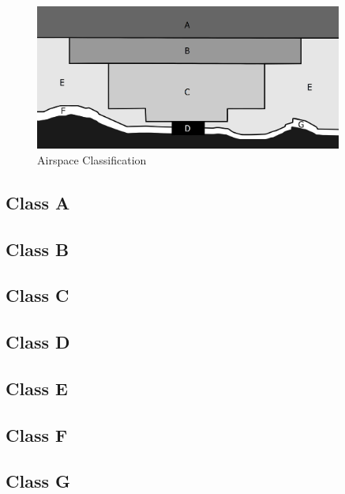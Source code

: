 \begin{figure}[h]
    \centering
    \includegraphics[width=0.9\textwidth]{figures/classes.png}
    \caption{Airspace Classification \cite{nolan}}
    \label{fig:classes}
\end{figure}

\subsection{Class A}
\subsection{Class B}
\subsection{Class C}
\subsection{Class D}
\subsection{Class E}
\subsection{Class F}
\subsection{Class G}







